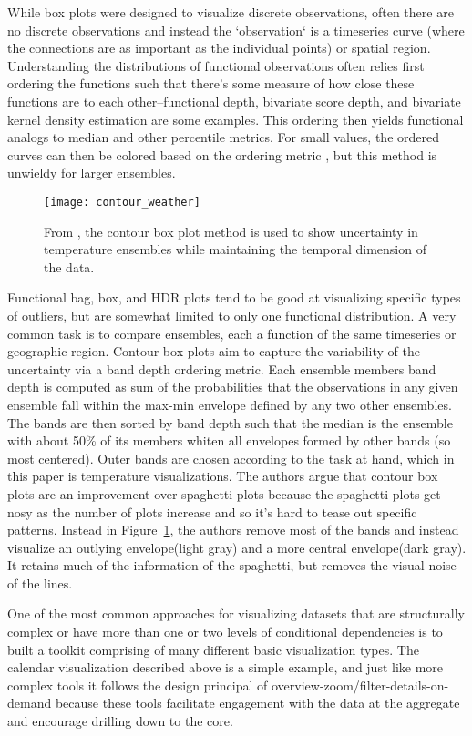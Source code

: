 \documentclass[../main.tex]{subfiles}
\begin{document}
While box plots were designed to visualize discrete observations, often there
are no discrete observations and instead the `observation` is a timeseries
curve (where the connections are as important as the individual points) or
spatial region. Understanding the distributions of functional observations
often relies first ordering the functions such that there's some measure of how close these functions are to each other--functional depth\cite{febrero_functional_2007},
bivariate score depth\cite{rob_j._hyndman_rainbow_2010}, and
bivariate kernel density estimation\cite{scott_multivariate_1992} are some examples. This
ordering then yields functional analogs to median and other percentile
metrics. For small values, the ordered curves can then be colored based on the
ordering metric \cite{rob_j._hyndman_rainbow_2010}, but this method is unwieldy for larger
ensembles.


\begin{figure}
  \texttt{[image: contour\_weather]}
  \caption{From \cite{whitaker_contour_2013}, the contour box plot method is used to show uncertainty in temperature ensembles while maintaining the temporal dimension of the data.}
  \label{fig:countour}
\end{figure}
Functional bag, box, and HDR plots \cite{rob_j._hyndman_rainbow_2010, sun_functional_2011} tend to be good at visualizing specific types of outliers, but are somewhat limited to only one functional distribution. A very common task is to compare ensembles, each a function of the same timeseries or geographic region. Contour box plots\cite{whitaker_contour_2013} aim to capture the variability of the
uncertainty via a band depth ordering metric. Each ensemble members band depth
is computed as sum of the probabilities that the observations in any given
ensemble fall within the max-min envelope defined by any two other
ensembles. The bands are then sorted by band depth such that the median is the
ensemble with about 50\% of its members whiten all envelopes formed by other
bands (so most centered). Outer bands are chosen according to the task at
hand, which in this paper is temperature visualizations. The authors argue that contour box plots are an improvement over spaghetti plots \cite{luo_visualizing_2003} because the spaghetti plots get nosy as the number of plots increase and so it's hard to tease out specific patterns. Instead in
Figure~\ref{fig:countour}, the authors remove most of the bands and instead visualize an outlying envelope(light gray) and a more central envelope(dark gray). It retains much of the information of
the spaghetti, but removes the visual noise of the lines.

One of the most common approaches for visualizing datasets that are structurally complex or have more than one or two levels of conditional dependencies is to built a toolkit comprising of many different basic visualization types. The calendar visualization described above is a simple example, and just like more complex tools it follows the design principal of overview-zoom/filter-details-on-demand \cite{shneiderman_eyes_1996} because these tools facilitate engagement with the data at the aggregate and encourage drilling down to the core. 
\end{document}

